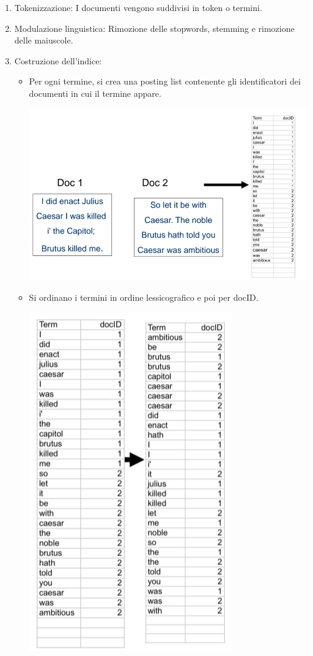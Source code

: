 \documentclass{report}
\begin{document}
	\begin{enumerate}
		\item Tokenizzazione: I documenti vengono suddivisi in token o termini.
		\item Modulazione linguistica: Rimozione delle stopwords, stemming e rimozione delle maiuscole.
		\item Costruzione dell'indice:
		\begin{itemize}
			\item Per ogni termine, si crea una posting list contenente gli identificatori dei documenti in cui il termine appare.
			\begin{center}
				\includegraphics[scale=0.4]{assets/invindexposting.png}
			\end{center}
			\item Si ordinano i termini in ordine lessicografico e poi per docID.
			\begin{center}
				\includegraphics[scale=0.4]{assets/invindexsorted.png}

\end{center}
\end{itemize}
\end{enumerate}
\end{document}
